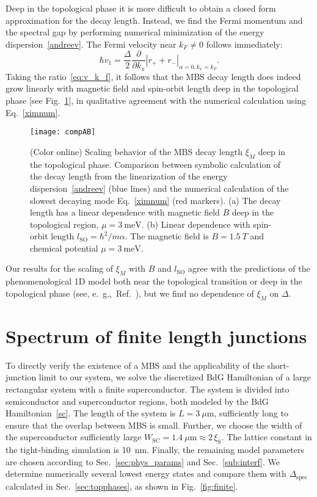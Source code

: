 \documentclass[twocolumn, notitlepage, 10pt, aps, floatfix, showpacs, prb, citeautoscript]{revtex4-1}
\begin{document}
Deep in the topological phase it is more difficult to obtain a closed form approximation for the decay length.
Instead, we find the Fermi momentum and the spectral gap by performing numerical minimization of the energy dispersion~\eqref{andreev}.
The Fermi velocity near $k_F\ne 0$ follows immediately:
\begin{equation}
\hbar v_1=\frac{\Delta}{2}\frac{\partial}{\partial k_x}|r_++r_-|_{\alpha=0,k_x=k_F}.
\end{equation}
Taking the ratio~\eqref{eq:v_k_f}, it follows that the MBS decay length does indeed grow linearly with magnetic field and spin-orbit length deep in the topological phase [see Fig.~\ref{fig:compAB}], in qualitative agreement with the numerical calculation using Eq.~\eqref{ximnum}.

\begin{figure}[t]
\texttt{[image: compAB]}
\caption{
(Color online)
Scaling behavior of the MBS decay length $\xi_M$ deep in the topological phase.
Comparison between symbolic calculation of the decay length from the linearization of the energy dispersion~\eqref{andreev} (blue lines) and the numerical calculation of the slowest decaying mode Eq.~\eqref{ximnum} (red markers).
(a) The decay length has a linear dependence with magnetic field $B$ deep in the topological region, $\mu=\SI{3}{\meV}$.
(b) Linear dependence with spin-orbit length $l_\mathrm{SO}=\hbar^2/m\alpha$.
The magnetic field is $B=\SI{1.5}{T}$ and chemical potential $\mu=\SI{3}{\meV}$.}
\label{fig:compAB}
\end{figure}

Our results for the scaling of $\xi_M$ with $B$ and $l_\textrm{SO}$ agree with the predictions of the phenomenological 1D model both near the topological transition or deep in the topological phase (see, e.~g.,~Ref.~), but we find no dependence of $\xi_M$ on $\Delta$.

\section{Spectrum of finite length junctions}
\label{sec:finite}

To directly verify the existence of a MBS and the applicability of the short-junction limit to our system, we solve the discretized BdG Hamiltonian of a large rectangular system with a finite superconductor.
The system is divided into semiconductor and superconductor regions, both modeled by the BdG Hamiltonian~\eqref{sc}.
The length of the system is $L=\SI{3}{\mu \m}$, sufficiently long to ensure that the overlap between MBS is small.
Further, we choose the width of the superconductor sufficiently large $W_\mathrm{SC}=\SI{1.4}{\mu\m} \approx 2\,\xi_\mathrm S$.
The lattice constant in the tight-binding simulation is \SI{10}{\nm}.
Finally, the remaining model parameters are chosen according to Sec.~\ref{sec:phys_params} and Sec.~\ref{sub:interf}.
We determine numerically several lowest energy states and compare them with $\Delta_\textrm{spec}$ calculated in Sec.~\ref{sec:topphases}, as shown in Fig.~\ref{fig:finite}.
\end{document}
